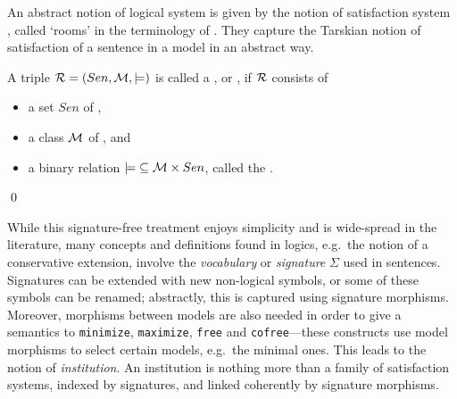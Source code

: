 \documentclass[10pt,fleqn,final]{scrreprt}
\newcommand{\cbs}[0]{\color{red}\xspace} %
\newcommand{\cbe}[0]{\color{black}\xspace} %
\newcommand*{\syntax}[1]{\texttt{#1}}
\newenvironment{definitions}[0]{\medskip }{}
\begin{document}
\begin{definitions}
\cbs An abstract notion of logical system is given by \cbe{} the notion of
satisfaction system \cite{carnielli2008analysis}, called `rooms' in
the terminology of \cite{CharPar}. They capture the Tarskian notion of
satisfaction of a sentence in a model in an abstract way.

\begin{definition}\label{def:room}
A triple ${\cal R}=(Sen,{{\cal M},\models)}$  is called a  , or , if ${\cal R}$  consists of
\begin{itemize}
\item a set $Sen$ of ,
\item a class
${\cal M}$ of , and
\item a binary relation
${\models}\subseteq {\cal M} \times Sen$, called the .
\end{itemize}\qed
\end{definition}


While this signature-free treatment enjoys simplicity and is wide-spread in the literature, many 
concepts and definitions found in logics, e.g.\ the notion of a conservative extension, involve the
\emph{vocabulary} or \emph{signature} $\Sigma$ \label{vocabulary} used in sentences.  Signatures 
can be extended with new non-logical symbols, or some of these symbols can be renamed; abstractly, 
this is captured using signature morphisms. Moreover,\cbs  morphisms
between models are also\cbe needed in order to give a semantics to \syntax{minimize},
\syntax{maximize}, \syntax{free} and \syntax{cofree}---these constructs
use model morphisms to select certain models, e.g.\ the minimal ones.
This leads to the notion of \emph{institution}. An institution
is nothing more than a family of satisfaction systems, indexed by
signatures, and linked coherently by signature morphisms.



\end{definitions}
\end{document}

